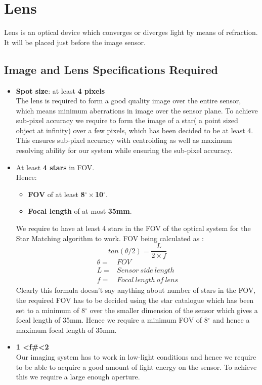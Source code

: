\documentclass[../../main.tex]{subfiles}
\begin{document}
\section{Lens}
Lens is an optical device which converges or diverges light by means of refraction. It will be placed just before the image sensor.

\subsection{Image and Lens Specifications Required}
\label{sec:imagespec}
\begin{itemize}
    \item \textbf{Spot size}: at least \textbf{4 pixels}
\\The lens is required to form a good quality image over the entire sensor, which means minimum aberrations in image over the sensor plane. To achieve sub-pixel accuracy we require to form the image of a star( a point sized object at infinity) over a few pixels, which has been decided to be at least 4. This ensures sub-pixel accuracy with centroiding as well as maximum resolving ability for our system while ensuring the sub-pixel accuracy.
 \item At least \textbf{4 stars} in FOV.\\Hence:
          \begin{itemize}
              \item \textbf{FOV} of at least \textbf{8$^{\circ}\times$10$^{\circ}$}.
              \item \textbf{Focal length} of at most \textbf{35mm}. 
          \end{itemize} 
We require to have at least 4 stars in the FOV of the optical system for the Star Matching algorithm to work. FOV being calculated as :
\begin{equation}
    tan(\theta/2)=\frac{L}{2\times f}
\end{equation}
\begin{align*}
    \theta=& FOV
    \\L=& Sensor\:side\:length
    \\f=& Focal\:length\:of\:lens 
\end{align*}
Clearly this formula doesn't say anything about number of stars in the FOV, the required FOV has to be decided using the star catalogue which has been set to a minimum of 8$^{\circ}$ over the smaller dimension of the sensor which gives a focal length of 35mm. Hence we require a minimum FOV of 8$^{\circ}$ and hence a maximum focal length of 35mm.
    \item \textbf{1 \textless f\#\textless 2}
\\Our imaging system has to work in low-light conditions and hence we require to be able to acquire a good amount of light energy on the sensor. To achieve this we require a large enough aperture.


\end{itemize}
\end{document}
